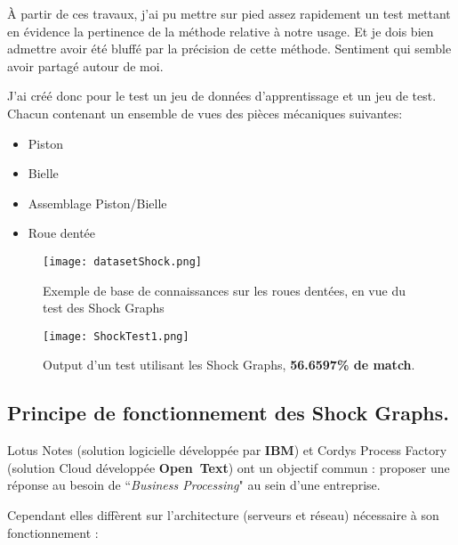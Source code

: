 À partir de ces travaux, j'ai pu mettre sur pied assez rapidement un test mettant en évidence la pertinence de la méthode relative à notre usage. Et je dois bien admettre avoir été bluffé par la précision de cette méthode. Sentiment qui semble avoir partagé autour de moi.

J'ai créé donc pour le test un jeu de données d'apprentissage et un jeu de test. Chacun contenant un ensemble de vues des pièces mécaniques suivantes:
\begin{itemize}
	\item 	Piston
	\item	Bielle
	\item	Assemblage Piston/Bielle
	\item	Roue dentée
\end{itemize}
\vspace{5mm}

\begin{figure}[H]
    \centering
    \texttt{[image: datasetShock.png]}
	\caption{Exemple de base de connaissances sur les roues dentées, en vue du test des Shock Graphs}\label{image.ShockGearDataset} 
\end{figure}
\vspace{-4mm}

\begin{figure}[H]
    \centering
    \texttt{[image: ShockTest1.png]}
	\caption{Output d'un test utilisant les Shock Graphs, \textbf{56.6597\% de match}.}\label{image.ShockTest1} 
\end{figure}


\clearpage

\subsection{Principe de fonctionnement des Shock Graphs.}

Lotus Notes (solution logicielle développée par \textbf{IBM}) et Cordys Process Factory (solution Cloud développée \textbf{Open~Text}) ont un objectif commun : proposer une réponse au  besoin de ``\textit{Business Processing}" au sein d'une entreprise.

Cependant elles diffèrent sur l'architecture (serveurs et réseau) nécessaire à son fonctionnement :

